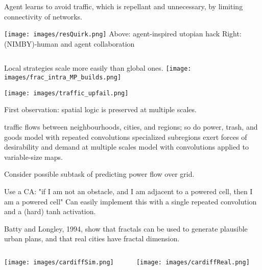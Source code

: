 \documentclass[xcolor=dvipsnames]{beamer}
\begin{document}
\begin{frame}
	\begin{columns}
		\begin{column}{0.3\textwidth}
			Agent learns to avoid traffic, which is repellant and unnecessary, by limiting connectivity of networks.
			\linebreak

			\texttt{[image: images/resQuirk.png]}
			{\small
			Above: agent-inspired utopian hack
			Right: (NIMBY)-human and agent collaboration
		}
		\end{column}
		\begin{column}{0.7\textwidth}
		\end{column}
	\end{columns}
\end{frame}
\begin{frame}
    Local strategies scale more easily than global ones.
    \texttt{[image: images/frac\_intra\_MP\_builds.png]}
\end{frame}
\begin{frame}
    \texttt{[image: images/traffic\_upfail.png]}
\end{frame}
\begin{frame}
	First observation: spatial logic is preserved at multiple scales.
	\begin{outline}
		\1 traffic flows between neighbourhoods, cities, and regions; so do power, trash, and goods
			\2 model with repeated convolutions		
		\1 specialized subregions exert forces of desirability and demand at multiple scales
			\2 model with convolutions applied to variable-size maps.
\end{outline}
	Consider possible subtask of predicting power flow over grid.
    \begin{outline}
        \1 Use a CA: "if I am not an obstacle, and I am adjacent to a powered cell, then I am a powered cell"
            \2 Can easily implement this with a single repeated convolution and a (hard) tanh activation.
    \end{outline}
\end{frame}
\begin{frame}
Batty and Longley, 1994, show that fractals can be used to generate plausible urban plans, and that real cities have fractal dimension.
\begin{columns}
    \begin{column}{0.5\linewidth}
        \texttt{[image: images/cardiffSim.png]}
    \end{column}
    \begin{column}{0.5\linewidth}
        \texttt{[image: images/cardiffReal.png]}
    \end{column}
\end{columns}
\end{frame}
\end{document}
